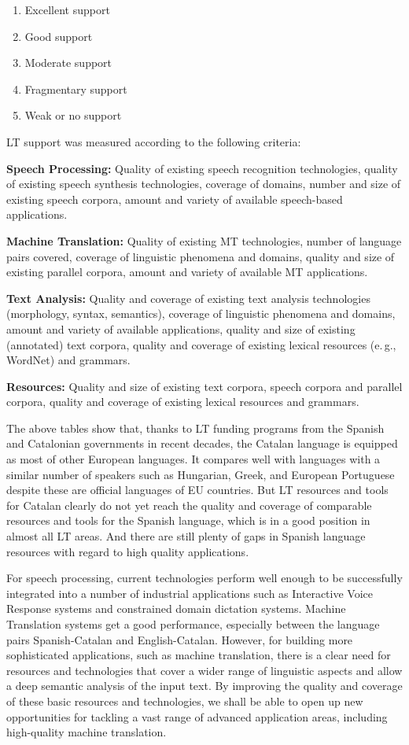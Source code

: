 \begin{multicols}{2}
\begin{enumerate}
\item Excellent support
\item Good support
\item Moderate support
\item Fragmentary support
\item Weak or no support
\end{enumerate}

LT support was measured according to the following criteria:

\textbf{Speech Processing:} Quality of existing speech recognition technologies, quality of existing speech synthesis technologies, coverage of domains, number and size of existing speech corpora, amount and variety of available speech-based applications.

\textbf{Machine Translation:} Quality of existing MT technologies, number of language pairs covered, coverage of linguistic phenomena and domains, quality and size of existing parallel corpora, amount and variety of available MT applications.

\textbf{Text Analysis:} Quality and coverage of existing text analysis technologies (morphology, syntax, semantics), coverage of linguistic phenomena and domains, amount and variety of available applications, quality and size of existing (annotated) text corpora, quality and coverage of existing lexical resources (e.\,g., WordNet) and grammars.

\textbf{Resources:} Quality and size of existing text corpora, speech corpora and parallel corpora, quality and coverage of existing lexical resources and grammars.

The above tables show that, thanks to LT funding programs from the Spanish and Catalonian governments in recent decades, the Catalan language is equipped as most of other European languages. It compares well with languages with a similar number of speakers such as Hungarian, Greek, and European Portuguese despite these are official languages of EU countries. But LT resources and tools for Catalan clearly do not yet reach the quality and coverage of comparable resources and tools for the Spanish language, which is in a good position in almost all LT areas. And there are still plenty of gaps in Spanish language resources with regard to high quality applications.

For speech processing, current technologies perform well enough to be successfully integrated into a number of industrial applications such as Interactive Voice Response systems and constrained domain dictation systems. Machine Translation systems get a good performance, especially between the language pairs Spanish-Catalan and English-Catalan. However, for building more sophisticated applications, such as machine translation, there is a clear need for resources and technologies that cover a wider range of linguistic aspects and allow a deep semantic analysis of the input text. By improving the quality and coverage of these basic resources and technologies, we shall be able to open up new opportunities for tackling a vast range of advanced application areas, including high-quality machine translation.  


\end{multicols}
